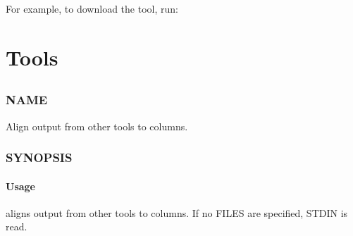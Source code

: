 \documentclass[letterpaper,10pt,english]{sphinxmanual}
\begin{document}
\sphinxAtStartPar
For example, to download the  tool, run:

\begin{sphinxVerbatim}[commandchars=\\\{\}]
 
\end{sphinxVerbatim}


\part{Tools}
\label{\detokenize{index:tools}}

\chapter{}
\label{\detokenize{mariadb-align-output:mariadb-align-output}}\label{\detokenize{mariadb-align-output::doc}}

\section{NAME}
\label{\detokenize{mariadb-align-output:name}}
\sphinxAtStartPar
{} \sphinxhyphen{} Align output from other tools to columns.


\section{SYNOPSIS}
\label{\detokenize{mariadb-align-output:synopsis}}

\subsection{Usage}
\label{\detokenize{mariadb-align-output:usage}}
\begin{sphinxVerbatim}[commandchars=\\\{\}]
 \PYG{p}{[}\PYG{p}{]}
\end{sphinxVerbatim}

\sphinxAtStartPar
{} aligns output from other tools to columns.  If no FILES are specified,
STDIN is read.
\end{document}
